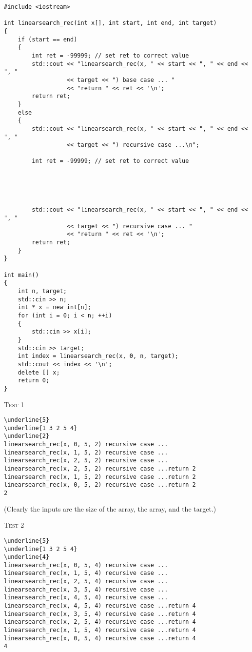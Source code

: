 \begin{Verbatim}[frame=single, fontsize=\small,commandchars=\~\!\@]
#include <iostream>

int linearsearch_rec(int x[], int start, int end, int target)
{
    if (start == end)
    {
        int ret = -99999; // set ret to correct value
        std::cout << "linearsearch_rec(x, " << start << ", " << end << ", "
                  << target << ") base case ... "
                  << "return " << ret << '\n';
        return ret;
    }
    else
    {
        std::cout << "linearsearch_rec(x, " << start << ", " << end << ", "
                  << target << ") recursive case ...\n";

        int ret = -99999; // set ret to correct value





        std::cout << "linearsearch_rec(x, " << start << ", " << end << ", "
                  << target << ") recursive case ... "
                  << "return " << ret << '\n';
        return ret;        
    }
}

int main()
{
    int n, target;
    std::cin >> n;
    int * x = new int[n];
    for (int i = 0; i < n; ++i)
    {
        std::cin >> x[i];
    }
    std::cin >> target;
    int index = linearsearch_rec(x, 0, n, target);
    std::cout << index << '\n';
    delete [] x;
    return 0;
}
\end{Verbatim}

\textsc{Test 1}
\begin{Verbatim}[commandchars=\\\{\}, fontsize=\small, frame=single]
\underline{5}
\underline{1 3 2 5 4}
\underline{2}
linearsearch_rec(x, 0, 5, 2) recursive case ...
linearsearch_rec(x, 1, 5, 2) recursive case ...
linearsearch_rec(x, 2, 5, 2) recursive case ...
linearsearch_rec(x, 2, 5, 2) recursive case ...return 2
linearsearch_rec(x, 1, 5, 2) recursive case ...return 2
linearsearch_rec(x, 0, 5, 2) recursive case ...return 2
2
\end{Verbatim}
(Clearly the inputs are the size of the array, the array, and the target.)

\textsc{Test 2}
\begin{Verbatim}[commandchars=\\\{\}, fontsize=\small, frame=single]
\underline{5}
\underline{1 3 2 5 4}
\underline{4}
linearsearch_rec(x, 0, 5, 4) recursive case ...
linearsearch_rec(x, 1, 5, 4) recursive case ...
linearsearch_rec(x, 2, 5, 4) recursive case ...
linearsearch_rec(x, 3, 5, 4) recursive case ...
linearsearch_rec(x, 4, 5, 4) recursive case ...
linearsearch_rec(x, 4, 5, 4) recursive case ...return 4
linearsearch_rec(x, 3, 5, 4) recursive case ...return 4
linearsearch_rec(x, 2, 5, 4) recursive case ...return 4
linearsearch_rec(x, 1, 5, 4) recursive case ...return 4
linearsearch_rec(x, 0, 5, 4) recursive case ...return 4
4
\end{Verbatim}

